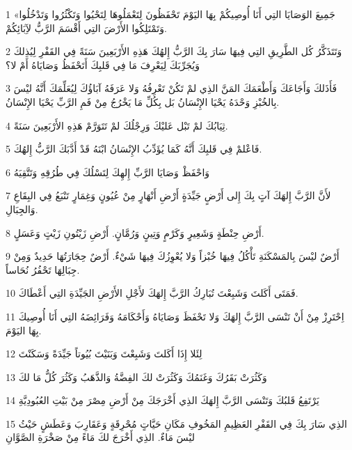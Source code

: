 \par 1 «جَمِيعَ الوَصَايَا التِي أَنَا أُوصِيكُمْ بِهَا اليَوْمَ تَحْفَظُونَ لِتَعْمَلُوهَا لِتَحْيُوا وَتَكْثُرُوا وَتَدْخُلُوا وَتَمْتَلِكُوا الأَرْضَ التِي أَقْسَمَ الرَّبُّ لآِبَائِكُمْ.
\par 2 وَتَتَذَكَّرُ كُل الطَّرِيقِ التِي فِيهَا سَارَ بِكَ الرَّبُّ إِلهُكَ هَذِهِ الأَرْبَعِينَ سَنَةً فِي القَفْرِ لِيُذِلكَ وَيُجَرِّبَكَ لِيَعْرِفَ مَا فِي قَلبِكَ أَتَحْفَظُ وَصَايَاهُ أَمْ لا؟
\par 3 فَأَذَلكَ وَأَجَاعَكَ وَأَطْعَمَكَ المَنَّ الذِي لمْ تَكُنْ تَعْرِفُهُ وَلا عَرَفَهُ آبَاؤُكَ لِيُعَلِّمَكَ أَنَّهُ ليْسَ بِالخُبْزِ وَحْدَهُ يَحْيَا الإِنْسَانُ بَل بِكُلِّ مَا يَخْرُجُ مِنْ فَمِ الرَّبِّ يَحْيَا الإِنْسَانُ.
\par 4 ثِيَابُكَ لمْ تَبْل عَليْكَ وَرِجْلُكَ لمْ تَتَوَرَّمْ هَذِهِ الأَرْبَعِينَ سَنَةً.
\par 5 فَاعْلمْ فِي قَلبِكَ أَنَّهُ كَمَا يُؤَدِّبُ الإِنْسَانُ ابْنَهُ قَدْ أَدَّبَكَ الرَّبُّ إِلهُكَ.
\par 6 وَاحْفَظْ وَصَايَا الرَّبِّ إِلهِكَ لِتَسْلُكَ فِي طُرُقِهِ وَتَتَّقِيَهُ
\par 7 لأَنَّ الرَّبَّ إِلهَكَ آتٍ بِكَ إِلى أَرْضٍ جَيِّدَةٍ أَرْضِ أَنْهَارٍ مِنْ عُيُونٍ وَغِمَارٍ تَنْبَعُ فِي البِقَاعِ وَالجِبَالِ.
\par 8 أَرْضِ حِنْطَةٍ وَشَعِيرٍ وَكَرْمٍ وَتِينٍ وَرُمَّانٍ. أَرْضِ زَيْتُونِ زَيْتٍ وَعَسَلٍ.
\par 9 أَرْضٌ ليْسَ بِالمَسْكَنَةِ تَأْكُلُ فِيهَا خُبْزاً وَلا يُعْوِزُكَ فِيهَا شَيْءٌ. أَرْضٌ حِجَارَتُهَا حَدِيدٌ وَمِنْ جِبَالِهَا تَحْفُرُ نُحَاساً.
\par 10 فَمَتَى أَكَلتَ وَشَبِعْتَ تُبَارِكُ الرَّبَّ إِلهَكَ لأَجْلِ الأَرْضِ الجَيِّدَةِ التِي أَعْطَاكَ.
\par 11 اِحْتَرِزْ مِنْ أَنْ تَنْسَى الرَّبَّ إِلهَكَ وَلا تَحْفَظَ وَصَايَاهُ وَأَحْكَامَهُ وَفَرَائِضَهُ التِي أَنَا أُوصِيكَ بِهَا اليَوْمَ.
\par 12 لِئَلا إِذَا أَكَلتَ وَشَبِعْتَ وَبَنَيْتَ بُيُوتاً جَيِّدَةً وَسَكَنْتَ
\par 13 وَكَثُرَتْ بَقَرُكَ وَغَنَمُكَ وَكَثُرَتْ لكَ الفِضَّةُ وَالذَّهَبُ وَكَثُرَ كُلُّ مَا لكَ
\par 14 يَرْتَفِعُ قَلبُكَ وَتَنْسَى الرَّبَّ إِلهَكَ الذِي أَخْرَجَكَ مِنْ أَرْضِ مِصْرَ مِنْ بَيْتِ العُبُودِيَّةِ
\par 15 الذِي سَارَ بِكَ فِي القَفْرِ العَظِيمِ المَخُوفِ مَكَانِ حَيَّاتٍ مُحْرِقَةٍ وَعَقَارِبَ وَعَطَشٍ حَيْثُ ليْسَ مَاءٌ. الذِي أَخْرَجَ لكَ مَاءً مِنْ صَخْرَةِ الصَّوَّانِ
